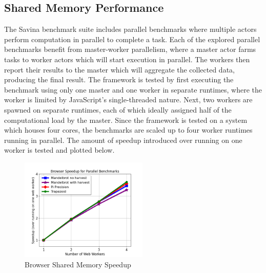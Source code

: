 \documentclass[lettersize,journal]{IEEEtran}
\begin{document}
\subsection{Shared Memory Performance}
The Savina benchmark suite includes parallel benchmarks where multiple actors perform computation in parallel to complete a task. Each of the explored parallel benchmarks benefit from master-worker parallelism, where a master actor farms tasks to worker actors which will start execution in parallel. The workers then report their results to the master which will aggregate the collected data, producing the final result. The framework is tested by first executing the benchmark using only one master and one worker in separate runtimes, where the worker is limited by JavaScript's single-threaded nature.  Next, two workers are spawned on separate runtimes, each of which ideally assigned half of the computational load by the master. Since the framework is tested on a system which houses four cores, the benchmarks are scaled up to four worker runtimes running in parallel. The amount of speedup introduced over running on one worker is tested and plotted below.
\begin{figure}[H]
    \begin{centering}
        \includegraphics[width=230px]{resources/browser_speedup.png}
        \caption{Browser Shared Memory Speedup}
    \end{centering}
\end{figure}
\end{document}
